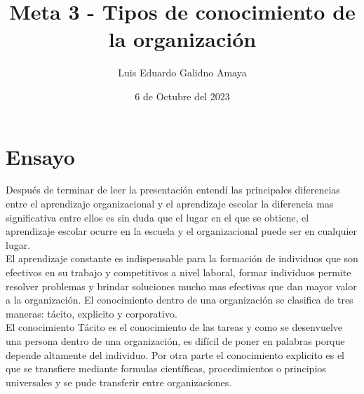 \documentclass[11pt]{article}
\author{Luis Eduardo Galidno Amaya}
\date{6 de Octubre del 2023}
\title{Meta 3 - Tipos de conocimiento de la organización}
\begin{document}

\section{Ensayo}
\label{sec:org807540a}
Después de terminar de leer la presentación entendí las principales diferencias
entre el aprendizaje organizacional y el aprendizaje escolar la diferencia mas
significativa entre ellos es sin duda que el lugar en el que se obtiene, el
aprendizaje escolar ocurre en la escuela y el organizacional puede ser en
cualquier lugar. \\

El aprendizaje constante es indispensable para la formación de individuos que
son efectivos en su trabajo y competitivos a nivel laboral, formar individuos
permite resolver problemas y brindar soluciones mucho mas efectivas que dan
mayor valor a la organización. El conocimiento dentro de una organización 
se clasifica de tres maneras: tácito, explicito y corporativo. \\

El conocimiento Tácito es el conocimiento de las tareas y como se desenvuelve
una persona dentro de una organización, es difícil de poner en palabras porque
depende altamente del individuo. Por otra parte el conocimiento explicito es el
que se transfiere mediante formulas científicas, procedimientos o principios
universales y se pude transferir entre organizaciones. \\
\end{document}
